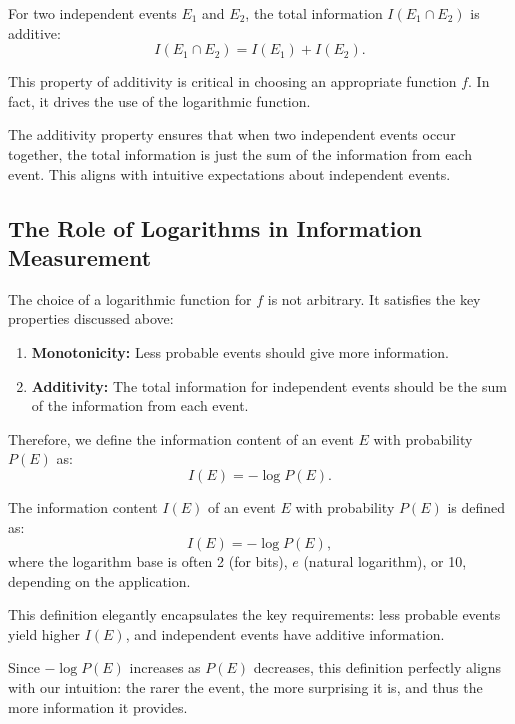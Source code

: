 \documentclass[12pt,a4paper]{article}
\newenvironment{thmbox}[1][]{%
  \begin{tcolorbox}[enhanced, breakable, colback=thmcolor, colframe=blue!50!black, title=#1, fonttitle=\bfseries, arc=3pt, boxrule=0.5pt]
}{\end{tcolorbox}}
\newenvironment{defbox}[1][]{%
  \begin{tcolorbox}[enhanced, breakable, colback=defcolor, colframe=green!50!black, title=#1, fonttitle=\bfseries, arc=3pt, boxrule=0.5pt]
}{\end{tcolorbox}}
\newenvironment{rembox}[1][]{%
  \begin{tcolorbox}[enhanced, breakable, colback=gray!5, colframe=gray!50, title=#1, fonttitle=\bfseries, arc=3pt, boxrule=0.5pt]
}{\end{tcolorbox}}
\begin{document}
\begin{thmbox}[Additivity of Information]
For two independent events $E_1$ and $E_2$, the total information $I(E_1 \cap E_2)$ is additive:
\[
I(E_1 \cap E_2) = I(E_1) + I(E_2).
\]
\end{thmbox}

This property of additivity is critical in choosing an appropriate function $f$. In fact, it drives the use of the logarithmic function.

\begin{rembox}[Why Additivity Matters]
The additivity property ensures that when two independent events occur together, the total information is just the sum of the information from each event. This aligns with intuitive expectations about independent events.
\end{rembox}

\subsection{The Role of Logarithms in Information Measurement}
The choice of a logarithmic function for $f$ is not arbitrary. It satisfies the key properties discussed above:
\begin{enumerate}
    \item \textbf{Monotonicity:} Less probable events should give more information.
    \item \textbf{Additivity:} The total information for independent events should be the sum of the information from each event.
\end{enumerate}

Therefore, we define the information content of an event $E$ with probability $P(E)$ as:
\[
I(E) = -\log P(E).
\]

\begin{defbox}[Definition of Information]
The information content $I(E)$ of an event $E$ with probability $P(E)$ is defined as:
\[
I(E) = -\log P(E),
\]
where the logarithm base is often 2 (for bits), $e$ (natural logarithm), or 10, depending on the application.
\end{defbox}

This definition elegantly encapsulates the key requirements: less probable events yield higher $I(E)$, and independent events have additive information.

\begin{rembox}[Implication of Negative Logarithm]
Since $-\log P(E)$ increases as $P(E)$ decreases, this definition perfectly aligns with our intuition: the rarer the event, the more surprising it is, and thus the more information it provides.
\end{rembox}
\end{document}
